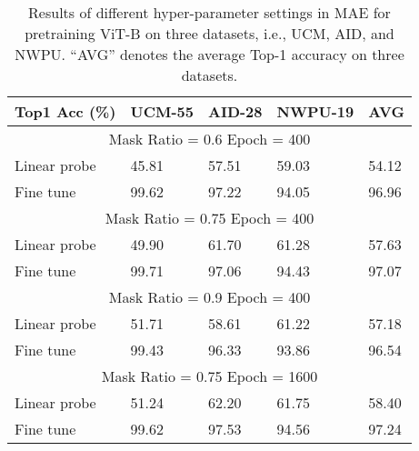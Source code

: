 \documentclass[10pt, journal,twoside]{IEEEtran}
\begin{document}
\begin{table}[t]
  \scriptsize
  \caption{Results of different hyper-parameter settings in MAE for pretraining ViT-B on three datasets, i.e., UCM, AID, and NWPU. ``AVG'' denotes the average Top-1 accuracy on three datasets.}
  \newcommand{\tabincell}[2]{\begin{tabular}{@{}#1@{}}#2\end{tabular}}
  \centering
\begin{tabular}{l|l|l|l|l}
  \hline
   Top1 Acc (\%) & UCM-55 & AID-28 & NWPU-19 & AVG \\
   \hline
   \multicolumn{5}{c}{Mask Ratio = 0.6 Epoch = 400}  \\
  \hline
  Linear probe & 45.81 & 57.51 & 59.03 & 54.12\\
  Fine tune & 99.62 & 97.22 & 94.05 & 96.96 \\
  \hline
  \multicolumn{5}{c}{Mask Ratio = 0.75 Epoch = 400}  \\
  \hline
  Linear probe & 49.90 & 61.70 & 61.28 & 57.63\\
  Fine tune & 99.71 & 97.06 & 94.43 & 97.07\\
  \hline
  \multicolumn{5}{c}{Mask Ratio = 0.9 Epoch = 400}  \\
  \hline
  Linear probe & 51.71 & 58.61 & 61.22 & 57.18 \\
  Fine tune & 99.43 & 96.33 & 93.86 & 96.54 \\
  \hline
  \multicolumn{5}{c}{Mask Ratio = 0.75 Epoch = 1600}  \\
  \hline
  Linear probe & 51.24 & 62.20 & 61.75 & 58.40 \\
  Fine tune & 99.62 & 97.53 & 94.56 & 97.24\\
  \hline
\end{tabular}
\label{mae_mask_ratio}
\end{table}
\end{document}
